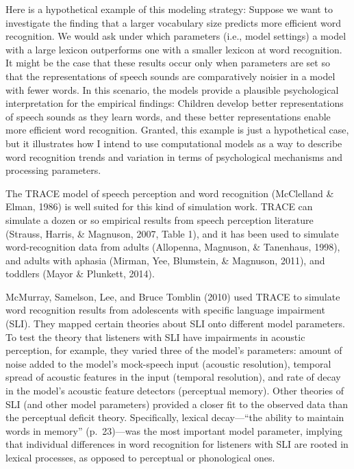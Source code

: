\documentclass[]{book}
\theoremstyle{definition}
\theoremstyle{definition}
\theoremstyle{remark}
\begin{document}
Here is a hypothetical example of this modeling strategy: Suppose we
want to investigate the finding that a larger vocabulary size predicts
more efficient word recognition. We would ask under which parameters
(i.e., model settings) a model with a large lexicon outperforms one with
a smaller lexicon at word recognition. It might be the case that these
results occur only when parameters are set so that the representations
of speech sounds are comparatively noisier in a model with fewer words.
In this scenario, the models provide a plausible psychological
interpretation for the empirical findings: Children develop better
representations of speech sounds as they learn words, and these better
representations enable more efficient word recognition. Granted, this
example is just a hypothetical case, but it illustrates how I intend to
use computational models as a way to describe word recognition trends
and variation in terms of psychological mechanisms and processing
parameters.

The TRACE model of speech perception and word recognition (McClelland \&
Elman, 1986) is well suited for this kind of simulation work. TRACE can
simulate a dozen or so empirical results from speech perception
literature (Strauss, Harris, \& Magnuson, 2007, Table 1), and it has
been used to simulate word-recognition data from adults (Allopenna,
Magnuson, \& Tanenhaus, 1998), and adults with aphasia (Mirman, Yee,
Blumstein, \& Magnuson, 2011), and toddlers (Mayor \& Plunkett, 2014).

McMurray, Samelson, Lee, and Bruce Tomblin (2010) used TRACE to simulate
word recognition results from adolescents with specific language
impairment (SLI). They mapped certain theories about SLI onto different
model parameters. To test the theory that listeners with SLI have
impairments in acoustic perception, for example, they varied three of
the model's parameters: amount of noise added to the model's mock-speech
input (acoustic resolution), temporal spread of acoustic features in the
input (temporal resolution), and rate of decay in the model's acoustic
feature detectors (perceptual memory). Other theories of SLI (and other
model parameters) provided a closer fit to the observed data than the
perceptual deficit theory. Specifically, lexical decay---``the ability
to maintain words in memory'' (p.~23)---was the most important model
parameter, implying that individual differences in word recognition for
listeners with SLI are rooted in lexical processes, as opposed to
perceptual or phonological ones.
\end{document}
